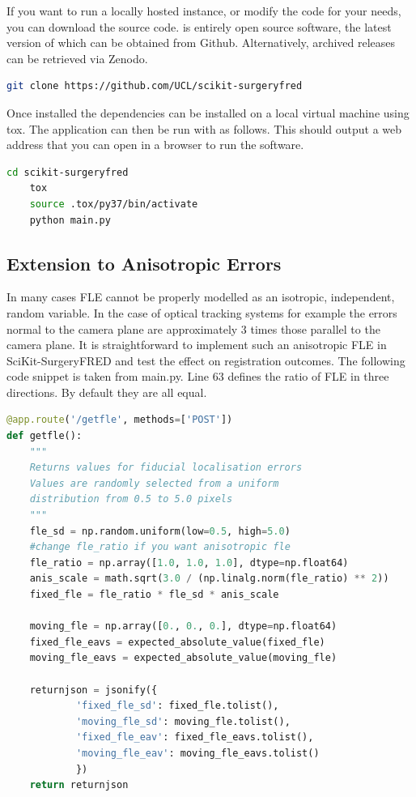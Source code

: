 If you want to run a locally hosted instance, or modify the code for your needs, you can download the source code. \fred is entirely open source software, the latest version of which can be obtained from Github. Alternatively, archived releases can be retrieved via Zenodo\cite{stephen_thompson_2020_4314971}.

\begin{lstlisting}[language=bash]
	git clone https://github.com/UCL/scikit-surgeryfred
\end{lstlisting}

Once installed the dependencies can be installed on a local virtual machine using tox. The application can then be run with as follows. This should output a web address that you can open in a browser to run the software. 

\begin{lstlisting}[language=bash]
	cd scikit-surgeryfred
	tox
	source .tox/py37/bin/activate
	python main.py
\end{lstlisting}

\subsection{Extension to Anisotropic Errors}
\label{sec:anis_method}
In many cases {FLE} cannot be properly modelled as an isotropic, independent, random variable. In the case of optical tracking systems for example \cite{10.1117/12.536128} the errors normal to the camera plane are approximately 3 times those parallel to the camera plane. It is straightforward to implement such an anisotropic \gls{FLE} in SciKit-SurgeryFRED and test the effect on registration outcomes.
The following code snippet is taken from  main.py. Line 63 defines the ratio of \gls{FLE} in three directions. By default they are all equal.

\begin{lstlisting}[language=python, firstnumber = 54]
@app.route('/getfle', methods=['POST'])
def getfle():
    """
    Returns values for fiducial localisation errors
    Values are randomly selected from a uniform
    distribution from 0.5 to 5.0 pixels
    """
    fle_sd = np.random.uniform(low=0.5, high=5.0)
    #change fle_ratio if you want anisotropic fle
    fle_ratio = np.array([1.0, 1.0, 1.0], dtype=np.float64)
    anis_scale = math.sqrt(3.0 / (np.linalg.norm(fle_ratio) ** 2))
    fixed_fle = fle_ratio * fle_sd * anis_scale

    moving_fle = np.array([0., 0., 0.], dtype=np.float64)
    fixed_fle_eavs = expected_absolute_value(fixed_fle)
    moving_fle_eavs = expected_absolute_value(moving_fle)

    returnjson = jsonify({
            'fixed_fle_sd': fixed_fle.tolist(),
            'moving_fle_sd': moving_fle.tolist(),
            'fixed_fle_eav': fixed_fle_eavs.tolist(),
            'moving_fle_eav': moving_fle_eavs.tolist()
            })
    return returnjson
\end{lstlisting}

